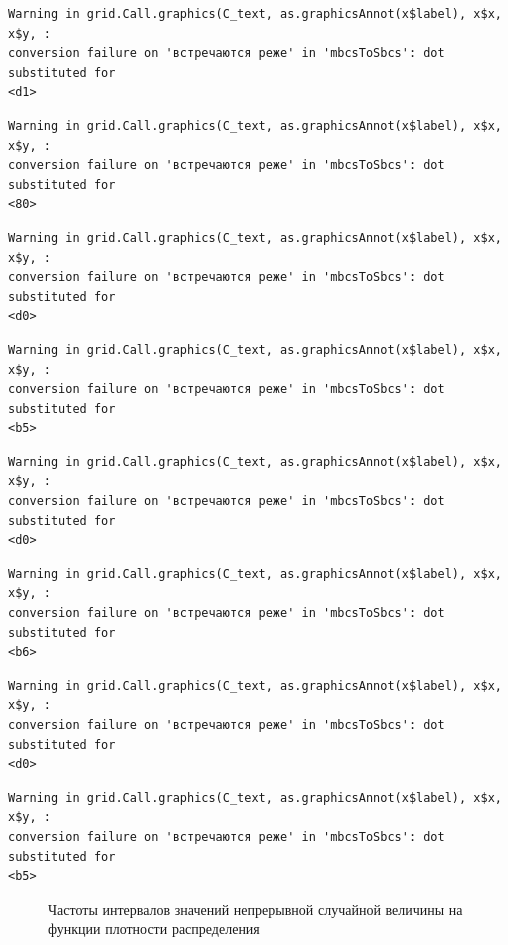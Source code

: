 \documentclass[
  letterpaper,
  DIV=11,
  numbers=noendperiod]{scrreprt}
\theoremstyle{definition}
\theoremstyle{remark}
\begin{document}
\begin{verbatim}
Warning in grid.Call.graphics(C_text, as.graphicsAnnot(x$label), x$x, x$y, :
conversion failure on 'встречаются реже' in 'mbcsToSbcs': dot substituted for
<d1>
\end{verbatim}

\begin{verbatim}
Warning in grid.Call.graphics(C_text, as.graphicsAnnot(x$label), x$x, x$y, :
conversion failure on 'встречаются реже' in 'mbcsToSbcs': dot substituted for
<80>
\end{verbatim}

\begin{verbatim}
Warning in grid.Call.graphics(C_text, as.graphicsAnnot(x$label), x$x, x$y, :
conversion failure on 'встречаются реже' in 'mbcsToSbcs': dot substituted for
<d0>
\end{verbatim}

\begin{verbatim}
Warning in grid.Call.graphics(C_text, as.graphicsAnnot(x$label), x$x, x$y, :
conversion failure on 'встречаются реже' in 'mbcsToSbcs': dot substituted for
<b5>
\end{verbatim}

\begin{verbatim}
Warning in grid.Call.graphics(C_text, as.graphicsAnnot(x$label), x$x, x$y, :
conversion failure on 'встречаются реже' in 'mbcsToSbcs': dot substituted for
<d0>
\end{verbatim}

\begin{verbatim}
Warning in grid.Call.graphics(C_text, as.graphicsAnnot(x$label), x$x, x$y, :
conversion failure on 'встречаются реже' in 'mbcsToSbcs': dot substituted for
<b6>
\end{verbatim}

\begin{verbatim}
Warning in grid.Call.graphics(C_text, as.graphicsAnnot(x$label), x$x, x$y, :
conversion failure on 'встречаются реже' in 'mbcsToSbcs': dot substituted for
<d0>
\end{verbatim}

\begin{verbatim}
Warning in grid.Call.graphics(C_text, as.graphicsAnnot(x$label), x$x, x$y, :
conversion failure on 'встречаются реже' in 'mbcsToSbcs': dot substituted for
<b5>
\end{verbatim}

\begin{figure}


\caption{\label{fig-continuous-freqs}Частоты интервалов значений
непрерывной случайной величины на функции плотности распределения}

\end{figure}%
\end{document}
